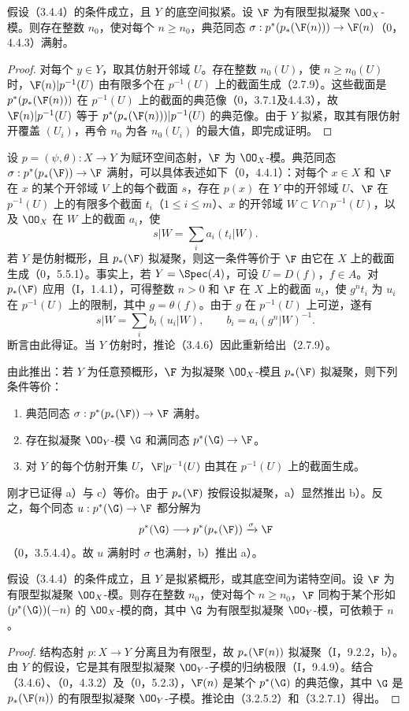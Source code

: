 假设（3.4.4）的条件成立，且 $Y$ 的底空间拟紧。设 $\F$ 为有限型拟凝聚 $\OO_X$-模。则存在整数 $n_0$，使对每个 $n\geq n_0$，典范同态
$\sigma:p^*(p_*(\F(n)))\to\F(n)$（0，4.4.3）满射。
\begin{proof}
对每个 $y\in Y$，取其仿射开邻域 $U$。存在整数 $n_0(U)$，使 $n\geq n_0(U)$ 时，$\F(n)|p^{-1}(U)$ 由有限多个在 $p^{-1}(U)$ 上的截面生成（2.7.9）。这些截面是 $p^*(p_*(\F(n)))$ 在 $p^{-1}(U)$ 上的截面的典范像（0，3.7.1及4.4.3），故 $\F(n)|p^{-1}(U)$ 等于 $p^*(p_*(\F(n)))|p^{-1}(U)$ 的典范像。由于 $Y$ 拟紧，取其有限仿射开覆盖 $(U_i)$，再令 $n_0$ 为各 $n_0(U_i)$ 的最大值，即完成证明。
\end{proof}

设 $p=(\psi,\theta):X\to Y$ 为赋环空间态射，$\F$ 为 $\OO_X$-模。典范同态 $\sigma:p^*(p_*(\F))\to\F$ 满射，可以具体表述如下（0，4.4.1）：对每个 $x\in X$ 和 $\F$ 在 $x$ 的某个开邻域 $V$ 上的每个截面 $s$，存在 $p(x)$ 在 $Y$ 中的开邻域 $U$、$\F$ 在 $p^{-1}(U)$ 上的有限多个截面 $t_i$（$1\leq i\leq m$）、$x$ 的开邻域 $W\subset V\cap p^{-1}(U)$，以及 $\OO_X$ 在 $W$ 上的截面 $a_i$，使
\[
s|W=\sum_i a_i(t_i|W).
\]
若 $Y$ 是仿射概形，且 $p_*(\F)$ 拟凝聚，则这一条件等价于 $\F$ 由它在 $X$ 上的截面生成（0，5.5.1）。事实上，若 $Y=\Spec(A)$，可设 $U=D(f)$，$f\in A$。对 $p_*(\F)$ 应用（I，1.4.1），可得整数 $n>0$ 和 $\F$ 在 $X$ 上的截面 $u_i$，使 $g^nt_i$ 为 $u_i$ 在 $p^{-1}(U)$ 上的限制，其中 $g=\theta(f)$。由于 $g$ 在 $p^{-1}(U)$ 上可逆，遂有
\[
s|W=\sum_i b_i(u_i|W),\qquad b_i=a_i(g^n|W)^{-1}.
\]
断言由此得证。当 $Y$ 仿射时，推论（3.4.6）因此重新给出（2.7.9）。

由此推出：若 $Y$ 为任意预概形，$\F$ 为拟凝聚 $\OO_X$-模且 $p_*(\F)$ 拟凝聚，则下列条件等价：
\begin{enumerate}[label=\alph*)]
\item 典范同态 $\sigma:p^*(p_*(\F))\to\F$ 满射。
\item 存在拟凝聚 $\OO_Y$-模 $\G$ 和满同态 $p^*(\G)\to\F$。
\item 对 $Y$ 的每个仿射开集 $U$，$\F|p^{-1}(U)$ 由其在 $p^{-1}(U)$ 上的截面生成。
\end{enumerate}
刚才已证得 a）与 c）等价。由于 $p_*(\F)$ 按假设拟凝聚，a）显然推出 b）。反之，每个同态 $u:p^*(\G)\to\F$ 都分解为
\[
p^*(\G)\longrightarrow p^*(p_*(\F))\xrightarrow{\sigma}\F
\]
（0，3.5.4.4）。故 $u$ 满射时 $\sigma$ 也满射，b）推出 a）。

假设（3.4.4）的条件成立，且 $Y$ 是拟紧概形，或其底空间为诺特空间。设 $\F$ 为有限型拟凝聚 $\OO_X$-模。则存在整数 $n_0$，使对每个 $n\geq n_0$，$\F$ 同构于某个形如 $(p^*(\G))(-n)$ 的 $\OO_X$-模的商，其中 $\G$ 为有限型拟凝聚 $\OO_Y$-模，可依赖于 $n$。
\begin{proof}
结构态射 $p:X\to Y$ 分离且为有限型，故 $p_*(\F(n))$ 拟凝聚（I，9.2.2，b）。由 $Y$ 的假设，它是其有限型拟凝聚 $\OO_Y$-子模的归纳极限（I，9.4.9）。结合（3.4.6）、（0，4.3.2）及（0，5.2.3），$\F(n)$ 是某个 $p^*(\G)$ 的典范像，其中 $\G$ 是 $p_*(\F(n))$ 的有限型拟凝聚 $\OO_Y$-子模。推论由（3.2.5.2）和（3.2.7.1）得出。
\end{proof}

